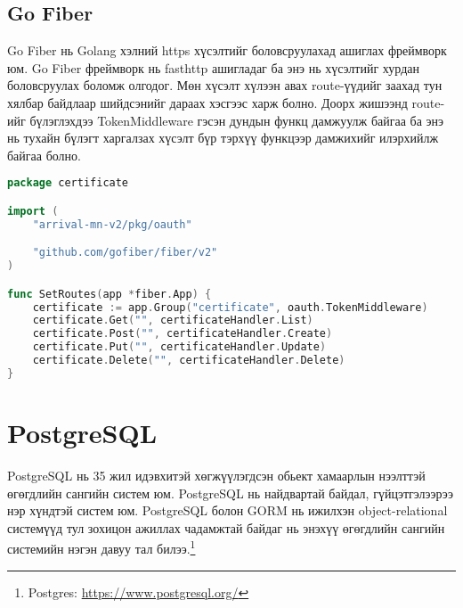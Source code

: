 \subsection{Go Fiber} 
Go Fiber нь Golang хэлний https хүсэлтийг боловсруулахад ашиглах фреймворк юм. Go Fiber фреймворк нь fasthttp ашигладаг ба энэ нь хүсэлтийг хурдан боловсруулах боломж олгодог. Мөн хүсэлт хүлээн авах route-үүдийг заахад тун хялбар байдлаар шийдсэнийг дараах хэсгээс харж болно. Доорх жишээнд route-ийг бүлэглэхдээ TokenMiddleware гэсэн дундын функц дамжуулж байгаа ба энэ нь тухайн бүлэгт харгалзах хүсэлт бүр тэрхүү функцээр дамжихийг илэрхийлж байгаа болно. 

\begin{lstlisting}[language=Go, caption=Go Fiber Routing жишээ, frame=single]
package certificate

import (
	"arrival-mn-v2/pkg/oauth"

	"github.com/gofiber/fiber/v2"
)

func SetRoutes(app *fiber.App) {
	certificate := app.Group("certificate", oauth.TokenMiddleware)
	certificate.Get("", certificateHandler.List)
	certificate.Post("", certificateHandler.Create)
	certificate.Put("", certificateHandler.Update)
	certificate.Delete("", certificateHandler.Delete)
}

\end{lstlisting}

\section{PostgreSQL} 
PostgreSQL нь 35 жил идэвхитэй хөгжүүлэгдсэн обьект хамаарлын нээлттэй өгөгдлийн сангийн систем юм. PostgreSQL нь найдвартай байдал, гүйцэтгэлээрээ нэр хүндтэй систем юм. PostgreSQL болон GORM нь ижилхэн object-relational системүүд тул зохицон ажиллах чадамжтай байдаг нь энэхүү өгөгдлийн сангийн системийн нэгэн давуу тал билээ.\footnote{Postgres: \url{https://www.postgresql.org/}}



